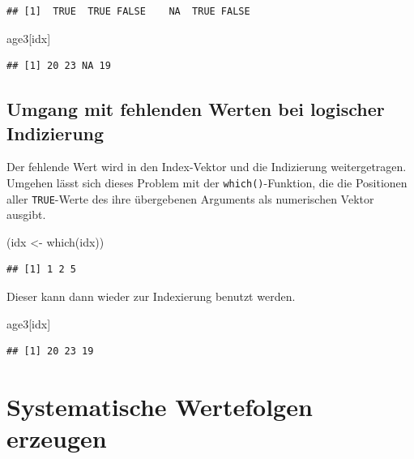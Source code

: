 \documentclass[
]{book}
\newenvironment{Shaded}{\begin{snugshade}}{\end{snugshade}}
\newcommand{\FunctionTok}[1]{\textcolor[rgb]{0.00,0.00,0.00}{#1}}
\newcommand{\NormalTok}[1]{#1}
\newcommand{\OtherTok}[1]{\textcolor[rgb]{0.56,0.35,0.01}{#1}}
\begin{document}
\begin{verbatim}
## [1]  TRUE  TRUE FALSE    NA  TRUE FALSE
\end{verbatim}

\begin{Shaded}
\begin{Highlighting}[]
\NormalTok{age3[idx]}
\end{Highlighting}
\end{Shaded}

\begin{verbatim}
## [1] 20 23 NA 19
\end{verbatim}

\hypertarget{umgang-mit-fehlenden-werten-bei-logischer-indizierung}{%
\subsection{Umgang mit fehlenden Werten bei logischer Indizierung}\label{umgang-mit-fehlenden-werten-bei-logischer-indizierung}}

Der fehlende Wert wird in den Index-Vektor und die Indizierung weitergetragen.\\
Umgehen lässt sich dieses Problem mit der \texttt{which()}-Funktion, die die Positionen aller \texttt{TRUE}-Werte des ihre übergebenen Arguments als numerischen Vektor ausgibt.

\begin{Shaded}
\begin{Highlighting}[]
\NormalTok{(idx }\OtherTok{\textless{}{-}} \FunctionTok{which}\NormalTok{(idx))}
\end{Highlighting}
\end{Shaded}

\begin{verbatim}
## [1] 1 2 5
\end{verbatim}

Dieser kann dann wieder zur Indexierung benutzt werden.

\begin{Shaded}
\begin{Highlighting}[]
\NormalTok{age3[idx]}
\end{Highlighting}
\end{Shaded}

\begin{verbatim}
## [1] 20 23 19
\end{verbatim}

\hypertarget{systematische-wertefolgen-erzeugen}{%
\section{Systematische Wertefolgen erzeugen}\label{systematische-wertefolgen-erzeugen}}
\end{document}
